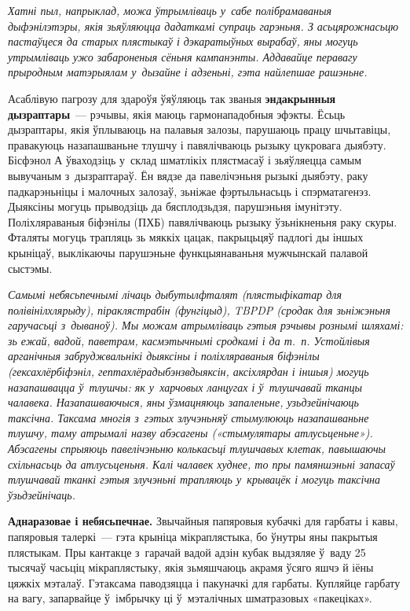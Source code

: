 \emph{Хатні пыл, напрыклад, можа ўтрымліваць у~сабе полібрамаваныя дыфэнілэтэры, якія зьяўляюцца дадаткамі супраць гарэньня. З асьцярожнасьцю пастаўцеся да старых плястыкаў і дэкаратыўных вырабаў, яны могуць утрымліваць ужо забароненыя сёньня кампанэнты. Аддавайце перавагу прыродным матэрыялам у~дызайне і адзеньні, гэта найлепшае рашэньне.}

Асаблівую пагрозу для здароўя ўяўляюць так званыя \textbf{эндакрынныя дызраптары}~--- рэчывы, якія маюць гармонападобныя эфэкты. Ёсьць дызраптары, якія ўплываюць на палавыя залозы, парушаюць працу шчытавіцы, правакуюць назапашваньне тлушчу і павялічваюць рызыку цукровага дыябэту. Бісфэнол А ўваходзіць у~склад шматлікіх плястмасаў і зьяўляецца самым вывучаным з~дызраптараў. Ён вядзе да павелічэньня рызыкі дыябэту, раку падкарэньніцы і малочных залозаў, зьніжае фэртыльнасьць і спэрматагенэз. Дыяксіны могуць прыводзіць да бясплодзьдзя, парушэньня імунітэту. Поліхляраваныя біфэнілы (ПХБ) павялічваюць рызыку ўзьнікненьня раку скуры. Фталяты могуць трапляць зь мяккіх цацак, пакрыцьцяў падлогі ды іншых крыніцаў, выклікаючы парушэньне функцыянаваньня мужчынскай палавой сыстэмы.

\emph{Самымі небясьпечнымі лічаць дыбутылфталят (плястыфікатар для полівінілхлярыду), піраклястрабін (фунгіцыд), TBPDP (сродак для зьніжэньня гаручасьці з~дываноў). Мы можам атрымліваць гэтыя рэчывы рознымі шляхамі: зь ежай, вадой, паветрам, касмэтычнымі сродкамі і да т.~п. Устойлівыя арганічныя забруджвальнікі дыяксіны і поліхляраваныя біфэнілы (гексахлёрбіфэніл, гептахлёрадыбэнзвдыяксін, аксіхлярдан і іншыя) могуць назапашвацца ў~тлушчы: як у~харчовых ланцугах і ў~тлушчавай тканцы чалавека. Назапашваючыся, яны ўзмацняюць запаленьне, узьдзейнічаюць таксічна. Таксама многія з~гэтых злучэньняў стымулююць назапашваньне тлушчу, таму атрымалі назву абэсагены («стымулятары атлусьценьне»). Абэсагены спрыяюць павелічэньню колькасьці тлушчавых клетак, павышаючы схільнасьць да атлусьценьня. Калі чалавек худнее, то пры памяншэньні запасаў тлушчавай тканкі гэтыя злучэньні трапляюць у~крывацёк і могуць таксічна ўзьдзейнічаць.}

\textbf{Аднаразовае і небясьпечнае.} Звычайныя папяровыя кубачкі для гарбаты і кавы, папяровыя талеркі~--- гэта крыніца мікраплястыка, бо ўнутры яны пакрытыя плястыкам. Пры кантакце з~гарачай вадой адзін кубак выдзяляе ў~ваду 25 тысячаў часьціц мікраплястыку, якія зьмяшчаюць акрамя ўсяго яшчэ й іёны цяжкіх мэталаў. Гэтаксама паводзяцца і пакуначкі для гарбаты. Купляйце гарбату на вагу, запарвайце ў~імбрычку ці ў~мэталічных шматразовых «пакеціках».


